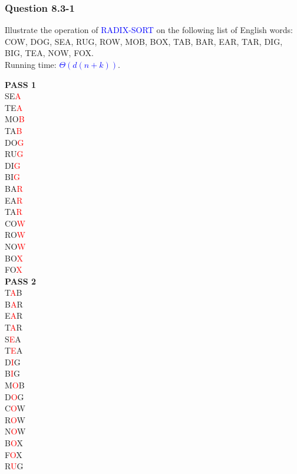 \documentclass[11pt]{article}
\begin{document}
\subsubsection*{Question 8.3-1}\nointerlineskip

Illustrate the operation of \textcolor{blue}{RADIX-SORT} on the following list of English words: COW, DOG, SEA, RUG, ROW, MOB, BOX, TAB, BAR, EAR, TAR, DIG, BIG, TEA, NOW, FOX.\\[6pt]
Running time: \textcolor{blue}{$\Theta(d(n+k))$}.\\[12pt]
\begin{center}
\begin{multicols}{3}
\noindent \textbf{PASS 1}\\
SE\textcolor{red}{A}\\
TE\textcolor{red}{A}\\
MO\textcolor{red}{B}\\
TA\textcolor{red}{B}\\
DO\textcolor{red}{G}\\
RU\textcolor{red}{G}\\
DI\textcolor{red}{G}\\
BI\textcolor{red}{G}\\
BA\textcolor{red}{R}\\
EA\textcolor{red}{R}\\
TA\textcolor{red}{R}\\
CO\textcolor{red}{W}\\
RO\textcolor{red}{W}\\
NO\textcolor{red}{W}\\
BO\textcolor{red}{X}\\
FO\textcolor{red}{X}\\

\columnbreak
\noindent \textbf{PASS 2}\\
\noindent T\textcolor{red}{A}B\\
B\textcolor{red}{A}R\\
E\textcolor{red}{A}R\\
T\textcolor{red}{A}R\\
S\textcolor{red}{E}A\\
T\textcolor{red}{E}A\\
D\textcolor{red}{I}G\\
B\textcolor{red}{I}G\\
M\textcolor{red}{O}B\\
D\textcolor{red}{O}G\\
C\textcolor{red}{O}W\\
R\textcolor{red}{O}W\\
N\textcolor{red}{O}W\\
B\textcolor{red}{O}X\\
F\textcolor{red}{O}X\\
R\textcolor{red}{U}G\\


\end{multicols}
\end{center}
\end{document}
